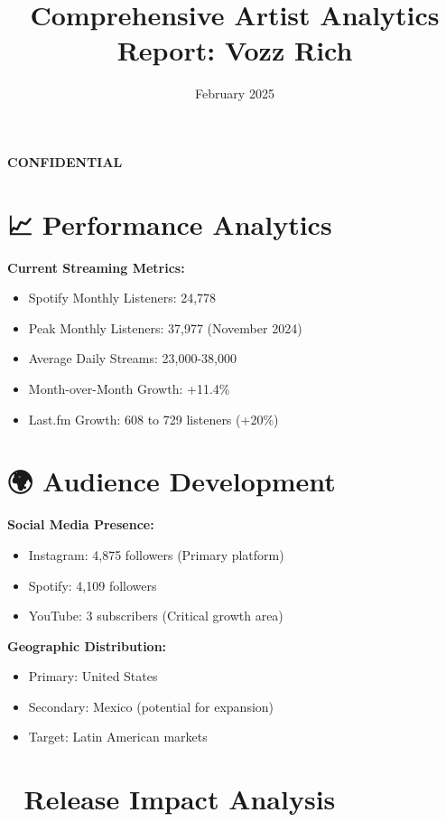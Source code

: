 \documentclass{article}
\begin{document}
\begin{center}
\Large\textbf{CONFIDENTIAL}
\end{center}

\title{Comprehensive Artist Analytics Report: Vozz Rich}
\date{February 2025}
\maketitle

\section*{📈 Performance Analytics}

\textbf{Current Streaming Metrics:}
\begin{itemize}
\item Spotify Monthly Listeners: 24,778
\item Peak Monthly Listeners: 37,977 (November 2024)
\item Average Daily Streams: 23,000-38,000
\item Month-over-Month Growth: +11.4\%
\item Last.fm Growth: 608 to 729 listeners (+20\%)
\end{itemize}

\section*{🌍 Audience Development}

\textbf{Social Media Presence:}
\begin{itemize}
\item Instagram: 4,875 followers (Primary platform)
\item Spotify: 4,109 followers
\item YouTube: 3 subscribers (Critical growth area)
\end{itemize}

\textbf{Geographic Distribution:}
\begin{itemize}
\item Primary: United States
\item Secondary: Mexico (potential for expansion)
\item Target: Latin American markets
\end{itemize}

\section*{🎵 Release Impact Analysis}
\end{document}
